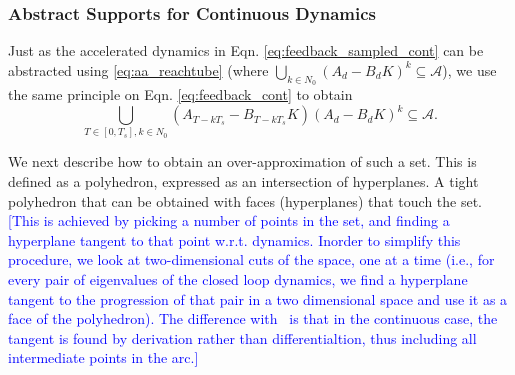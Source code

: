 \documentclass[twocolumn]{autart}    %
\newcommand{\mat}[1]{{#1}}
\newcommand{\reply}[1]{\textcolor{blue}{[#1]}}
\begin{document}
 \subsubsection{Abstract Supports for Continuous Dynamics}
 \label{sec:cont_aasup}

Just as the accelerated dynamics in Eqn. \eqref{eq:feedback_sampled_cont} can be abstracted using \eqref{eq:aa_reachtube} (where $\bigcup_{k \in N_0} (\mat{A}_d-\mat{B}_d\mat{K}) ^k \subseteq \mathcal{A}$), 
we use the same principle on Eqn. \eqref{eq:feedback_cont} to obtain 
\begin{equation}\label{eq:aa_cont_amatrix}
\bigcup_{T \in [0, T_s], k \in N_0} (\mat{A}_{T-kT_s}-\mat{B}_{T-kT_s}\mat{K}) (\mat{A}_d-\mat{B}_d\mat{K})^k \subseteq \mathcal{A}.
\end{equation}

We next describe how to obtain an over-approximation of such a set. 
This is defined as a polyhedron, expressed as an intersection of hyperplanes. 
A tight polyhedron that can be obtained with faces (hyperplanes) that touch the set. 
\reply{This is achieved by picking a number of points in the set, and finding a hyperplane
tangent to that point w.r.t. dynamics.  Inorder to simplify this procedure, we
look at two-dimensional cuts of the space, one at a time (i.e., for every pair
of eigenvalues of the closed loop dynamics, we find a hyperplane tangent to
the progression of that pair in a two dimensional space and use it as a face of
the polyhedron).  The difference with~\cite{cattaruzza2015unbounded} is that
in the continuous case, the tangent is found by derivation rather than
differentialtion, thus including all intermediate points in the arc.}

\end{document}
